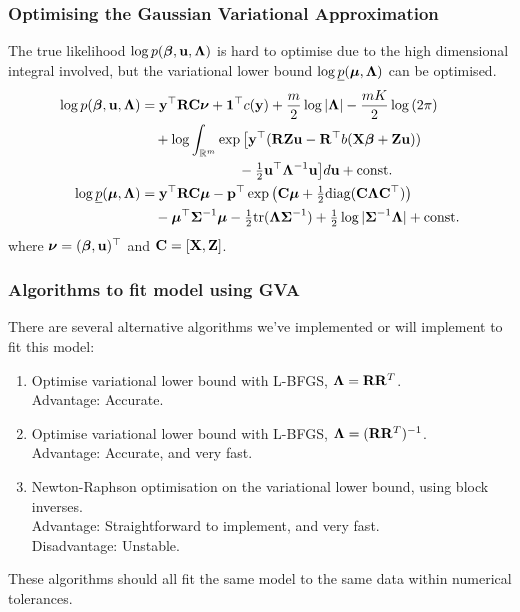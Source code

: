 \documentclass{beamer}
\begin{document}
\begin{frame}
	\frametitle{Optimising the Gaussian Variational Approximation}
	The true likelihood $\log p({\boldsymbol \beta}, {\bf u}, {\boldsymbol \Lambda})$ is hard to optimise due 
	to the high dimensional integral involved, but the variational lower bound $\log \underline{p}({\boldsymbol \mu}, {\boldsymbol \Lambda})$ can be optimised.
	\begin{align*}
		\log p({\boldsymbol \beta}, {\bf u}, {\boldsymbol \Lambda})      & = {\bf y}^\top {\bf R} {\bf C} {\boldsymbol\nu} + {\bf 1}^\top c({\bf y}) + \frac{m}{2} \log |{\boldsymbol \Lambda}| - \frac{mK}{2} \log{(2 \pi)}                           \\
		                                   & \quad + \log  \int_{\mathbb{R}^{m}} \exp \big[ {\bf y}^\top ({\bf R} {\bf Z} {\bf u} - {\bf R}^\top b( {\bf X} {\boldsymbol \beta} + {\bf Z} {\bf u}))                        \\
		                                   & \quad \quad \quad \quad \quad \quad \quad - \tfrac{1}{2} {{\bf u}^\top {\boldsymbol\Lambda}^{-1} {\bf u} } \big] d {\bf u} + \text{const.}                   \\
		\log \underline{p}({\boldsymbol \mu}, {\boldsymbol \Lambda}) & = {\bf y}^\top {\bf R} {\bf C} {\boldsymbol\mu} - {\bf p}^\top \exp{\left({\bf C}{\boldsymbol\mu}+  \tfrac{1}{2} \text{diag}{({\bf C}{\boldsymbol\Lambda}{\bf C}^\top)}\right)}                               \\
		                                   & \quad - {\boldsymbol \mu}^\top {\boldsymbol\Sigma}^{-1} {\boldsymbol \mu} - \tfrac{1}{2} \text{tr}{({\boldsymbol\Lambda}{\boldsymbol\Sigma}^{-1})} + \tfrac{1}{2} \log{|{\boldsymbol\Sigma}^{-1}{\boldsymbol\Lambda}|} + \text{const.} \\
	\end{align*}
	where ${\boldsymbol \nu} = ({\boldsymbol \beta}, {\bf u})^\top$ and ${\bf C} = [{\bf X}, {\bf Z}]$.
\end{frame}

\begin{frame}
	\frametitle{Algorithms to fit model using GVA}
	There are several alternative algorithms we've implemented or will implement
	to fit this model:
	\begin{enumerate}
		\item Optimise variational lower bound with L-BFGS, ${\boldsymbol \Lambda} = {\bf R} {\bf R}^T$.\\
		      Advantage: Accurate.
		\item Optimise variational lower bound with L-BFGS, ${\boldsymbol \Lambda} = ({\bf R} {\bf R}^T)^{-1}$. \\
		      Advantage: Accurate, and very fast.
		\item Newton-Raphson optimisation on the variational lower bound, using block inverses. \\
		      Advantage: Straightforward to implement, and very fast. \\
		      Disadvantage: Unstable.
	\end{enumerate}
	
	These algorithms should all fit the same model to the same data
	within numerical tolerances.
\end{frame}
\end{document}
